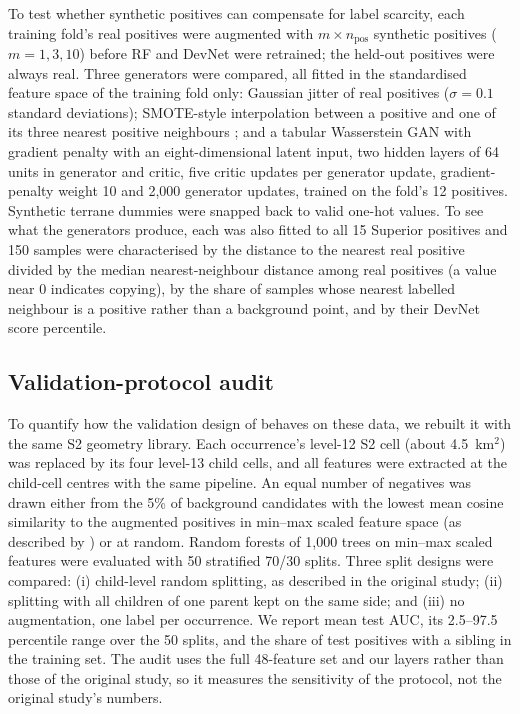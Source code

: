 \documentclass[pdflatex,sn-apa]{sn-jnl}
\begin{document}
To test whether synthetic positives can compensate for label scarcity, each training fold's real positives were augmented with $m \times n_{\mathrm{pos}}$ synthetic positives ($m = 1, 3, 10$) before RF and DevNet were retrained; the held-out positives were always real. Three generators were compared, all fitted in the standardised feature space of the training fold only: Gaussian jitter of real positives ($\sigma = 0.1$ standard deviations); SMOTE-style interpolation between a positive and one of its three nearest positive neighbours \citep{Chawla2002}; and a tabular Wasserstein GAN with gradient penalty \citep[WGAN-GP;][]{Goodfellow2014,Arjovsky2017,Gulrajani2017} with an eight-dimensional latent input, two hidden layers of 64 units in generator and critic, five critic updates per generator update, gradient-penalty weight 10 and 2,000 generator updates, trained on the fold's 12 positives. Synthetic terrane dummies were snapped back to valid one-hot values. To see what the generators produce, each was also fitted to all 15 Superior positives and 150 samples were characterised by the distance to the nearest real positive divided by the median nearest-neighbour distance among real positives (a value near 0 indicates copying), by the share of samples whose nearest labelled neighbour is a positive rather than a background point, and by their DevNet score percentile.

\subsection{Validation-protocol audit}\label{sec:audit-methods}

To quantify how the validation design of \citet{Parsa2024} behaves on these data, we rebuilt it with the same S2 geometry library. Each occurrence's level-12 S2 cell (about 4.5~km$^2$) was replaced by its four level-13 child cells, and all features were extracted at the child-cell centres with the same pipeline. An equal number of negatives was drawn either from the 5\% of background candidates with the lowest mean cosine similarity to the augmented positives in min--max scaled feature space (as described by \citealp{Parsa2024}) or at random. Random forests of 1,000 trees on min--max scaled features were evaluated with 50 stratified 70/30 splits. Three split designs were compared: (i) child-level random splitting, as described in the original study; (ii) splitting with all children of one parent kept on the same side; and (iii) no augmentation, one label per occurrence. We report mean test AUC, its 2.5--97.5 percentile range over the 50 splits, and the share of test positives with a sibling in the training set. The audit uses the full 48-feature set and our layers rather than those of the original study, so it measures the sensitivity of the protocol, not the original study's numbers.
\end{document}
